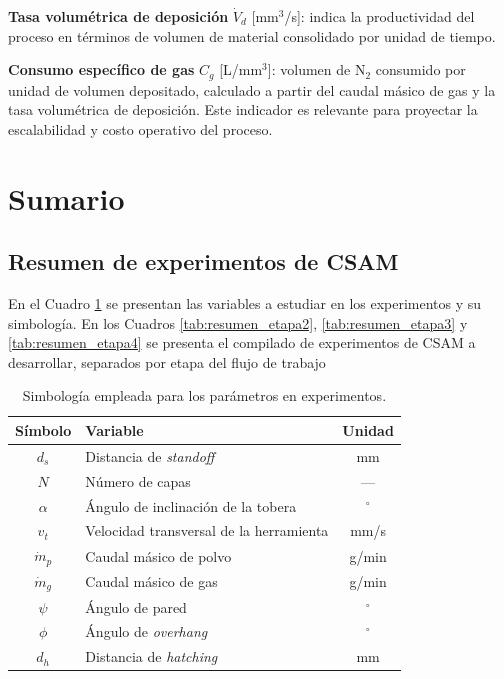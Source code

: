\textbf{Tasa volumétrica de deposición} $\dot{V}_d$ [mm$^3$/s]: indica la productividad del proceso en términos de volumen de material consolidado por unidad de tiempo.

\textbf{Consumo específico de gas} $C_g$ [L/mm$^3$]: volumen de N$_2$ consumido por unidad de volumen depositado, calculado a partir del caudal másico de gas y la tasa volumétrica de deposición. Este indicador es relevante para proyectar la escalabilidad y costo operativo del proceso.

\section{Sumario}

\subsection{Resumen de experimentos de CSAM}

En el Cuadro \ref{tab:simbologia_experimental} se presentan las variables a estudiar en los experimentos y su simbología. En los Cuadros \ref{tab:resumen_etapa2}, \ref{tab:resumen_etapa3} y \ref{tab:resumen_etapa4} se presenta el compilado de experimentos de CSAM a desarrollar, separados por etapa del flujo de trabajo

\begin{table}[htbp]
	\centering
	\caption[Simbología empleada para los parámetros en experimentos]{Simbología empleada para los parámetros en experimentos.}
	\label{tab:simbologia_experimental}
	\footnotesize
	\begin{tabular}{clc}
		\toprule
		\textbf{Símbolo} & \textbf{Variable} & \textbf{Unidad}   \\
		\midrule
		$d_s$       & Distancia de \textit{standoff}              & mm           \\
		$N$         & Número de capas                             & ---          \\
		$\alpha$    & Ángulo de inclinación de la tobera          & $^\circ$    \\
		$v_t$       & Velocidad transversal de la herramienta     & mm/s         \\
		$\dot{m}_p$ & Caudal másico de polvo                      & g/min       \\
		$\dot{m}_g$ & Caudal másico de gas                        & g/min        \\
		$\psi$      & Ángulo de pared                             & $^\circ$    \\
		$\phi$      & Ángulo de \textit{overhang}                 & $^\circ$     \\
		$d_h$       & Distancia de \textit{hatching}              & mm           \\
		\bottomrule
	\end{tabular}
\end{table}

